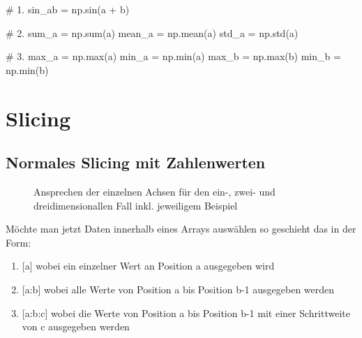 \documentclass[
  letterpaper,
  DIV=11,
  numbers=noendperiod]{scrreprt}
\newenvironment{Shaded}{\begin{snugshade}}{\end{snugshade}}
\newcommand{\BuiltInTok}[1]{\textcolor[rgb]{0.00,0.23,0.31}{#1}}
\newcommand{\CommentTok}[1]{\textcolor[rgb]{0.37,0.37,0.37}{#1}}
\newcommand{\NormalTok}[1]{\textcolor[rgb]{0.00,0.23,0.31}{#1}}
\newcommand{\OperatorTok}[1]{\textcolor[rgb]{0.37,0.37,0.37}{#1}}
\providecommand{\tightlist}{%
  \setlength{\itemsep}{0pt}\setlength{\parskip}{0pt}}\usepackage{longtable,booktabs,array}
\begin{document}
\begin{tcolorbox}
\begin{tcolorbox}
\begin{Shaded}
\begin{Highlighting}[]
\CommentTok{\# 1.}
\NormalTok{sin\_ab }\OperatorTok{=}\NormalTok{ np.sin(a }\OperatorTok{+}\NormalTok{ b)}

\CommentTok{\# 2.}
\NormalTok{sum\_a }\OperatorTok{=}\NormalTok{ np.}\BuiltInTok{sum}\NormalTok{(a)}
\NormalTok{mean\_a }\OperatorTok{=}\NormalTok{ np.mean(a)}
\NormalTok{std\_a }\OperatorTok{=}\NormalTok{ np.std(a)}

\CommentTok{\# 3.}
\NormalTok{max\_a }\OperatorTok{=}\NormalTok{ np.}\BuiltInTok{max}\NormalTok{(a)}
\NormalTok{min\_a }\OperatorTok{=}\NormalTok{ np.}\BuiltInTok{min}\NormalTok{(a)}
\NormalTok{max\_b }\OperatorTok{=}\NormalTok{ np.}\BuiltInTok{max}\NormalTok{(b)}
\NormalTok{min\_b }\OperatorTok{=}\NormalTok{ np.}\BuiltInTok{min}\NormalTok{(b)}
\end{Highlighting}
\end{Shaded}

\end{tcolorbox}

\end{tcolorbox}

\chapter{Slicing}\label{slicing}

\section{Normales Slicing mit
Zahlenwerten}\label{normales-slicing-mit-zahlenwerten}

\begin{figure}


\caption{\label{fig-slicing}Ansprechen der einzelnen Achsen für den
ein-, zwei- und dreidimensionallen Fall inkl. jeweiligem Beispiel}

\end{figure}%

Möchte man jetzt Daten innerhalb eines Arrays auswählen so geschieht das
in der Form:

\begin{enumerate}
\def\labelenumi{\arabic{enumi}.}
\tightlist
\item
  {[}a{]} wobei ein einzelner Wert an Position a ausgegeben wird
\item
  {[}a:b{]} wobei alle Werte von Position a bis Position b-1 ausgegeben
  werden
\item
  {[}a:b:c{]} wobei die Werte von Position a bis Position b-1 mit einer
  Schrittweite von c ausgegeben werden
\end{enumerate}
\end{document}
